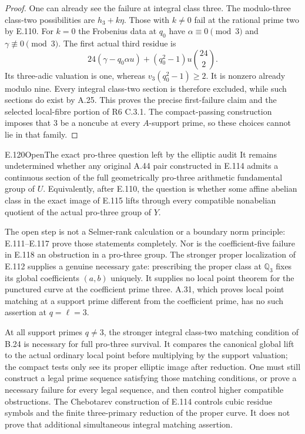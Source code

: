 \begin{proof}
One can already see the failure at integral class three. The
modulo-three class-two possibilities are $h_3+k\eta$. Those with
$k\ne0$ fail at the rational prime two by E.110. For $k=0$ the
Frobenius data at $q_0$ have $\alpha\equiv0\pmod3$ and
$\gamma\not\equiv0\pmod3$. The first actual third residue is
\[
 24(\gamma-q_0\alpha u)+(q_0^2-1)u\binom{24}{2}.
\]
Its three-adic valuation is one, whereas
$v_3(q_0^2-1)\ge2$. It is nonzero already modulo nine. Every
integral class-two section is therefore excluded, while such
sections do exist by A.25. This proves the precise first-failure
claim and the selected local-fibre portion of R6 C.3.1.
The compact-passing construction imposes that $3$ be a noncube at
every $A$-support prime, so these choices cannot lie in that family.
\end{proof}

\begin{result}{E.120}{Open}{The exact pro-three question left by the elliptic audit}
It remains undetermined whether any original A.44 pair constructed
in E.114 admits a continuous section of the full geometrically
pro-three arithmetic fundamental group of $U$. Equivalently, after
E.110, the question is whether some affine abelian class in the exact
image of E.115 lifts through every compatible nonabelian quotient
of the actual pro-three group of $Y$.
\end{result}
The open step is not a Selmer-rank calculation or a boundary norm
principle: E.111--E.117 prove those statements completely. Nor is
the coefficient-five failure in E.118 an obstruction in a pro-three
group. The stronger proper localization of E.112 supplies a genuine
necessary gate: prescribing the proper class at $\mathbb Q_3$
fixes its global coefficients $(a,b)$ uniquely. It supplies no
local point theorem for the punctured curve at the coefficient
prime three. A.31, which proves local point matching at a support
prime different from the coefficient prime, has no such assertion
at $q=\ell=3$.

At all support primes $q\ne3$, the stronger integral class-two
matching condition of B.24 is necessary for full pro-three
survival. It compares the canonical global lift to the actual
ordinary local point before multiplying by the support valuation;
the compact tests only see its proper elliptic image after reduction.
One must still construct a legal prime sequence satisfying those
matching conditions, or prove a necessary failure for every legal
sequence, and then control higher compatible obstructions. The
Chebotarev construction of E.114 controls cubic residue symbols and
the finite three-primary reduction of the proper curve. It does not
prove that additional simultaneous integral matching assertion.


